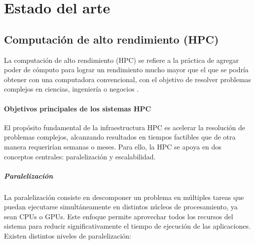 \chapter{Estado del arte}\label{cap:estado_del_arte}



\section{Computación de alto rendimiento (\acs{HPC})}\label{sec:computacion_alto_rendimiento}

La computación de alto rendimiento (\acs{HPC}) se refiere a la práctica de agregar poder de cómputo para lograr un rendimiento mucho mayor que el que se podría obtener con una computadora convencional, con el objetivo de resolver problemas complejos en ciencias, ingeniería o negocios \cite{sravanthi2014HPC}.

\subsubsection{Objetivos principales de los sistemas \acs{HPC}}

El propósito fundamental de la infraestructura \acs{HPC} es acelerar la resolución de problemas complejos, alcanzando resultados en tiempos factibles que de otra manera requerirían semanas o meses. Para ello, la \acs{HPC} se apoya en dos conceptos centrales: paralelización y escalabilidad.

\paragraph{Paralelización}
La paralelización consiste en descomponer un problema en múltiples tareas que puedan ejecutarse simultáneamente en distintos núcleos de procesamiento, ya sean CPUs o GPUs. Este enfoque permite aprovechar todos los recursos del sistema para reducir significativamente el tiempo de ejecución de las aplicaciones. Existen distintos niveles de paralelización:

